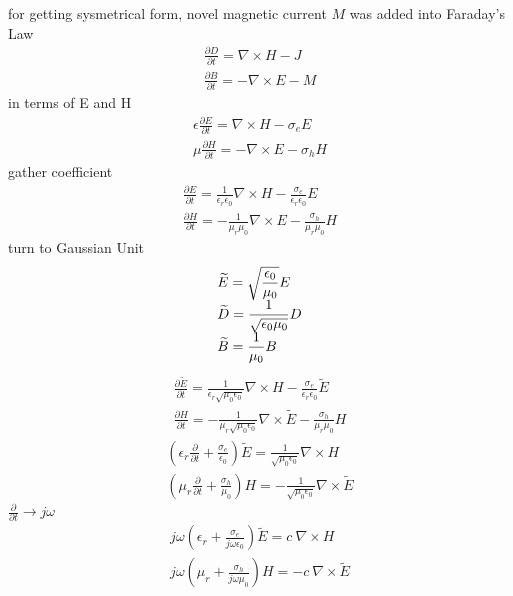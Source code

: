 for getting sysmetrical form, novel magnetic current $M$ was added into Faraday's Law
\begin{gather}
  \frac{\partial D}{\partial t} = \nabla \times H - J\\
  \frac{\partial B}{\partial t} =  - \nabla \times E - M
\end{gather}
in terms of E and H
\begin{gather}
  \epsilon\frac{\partial E}{\partial t} = \nabla \times H - \sigma_eE\\
  \mu\frac{\partial H}{\partial t} = - \nabla \times E - \sigma_hH
\end{gather}
gather coefficient 
\begin{gather}
  \frac{\partial E}{\partial t} = \frac{1}{\epsilon_r\epsilon_0}\nabla\times H - \frac{\sigma_e}{\epsilon_r\epsilon_0}E\\
  \frac{\partial H}{\partial t} = - \frac{1}{\mu_r\mu_0}\nabla\times E - \frac{\sigma_h}{\mu_r\mu_0}H
\end{gather}
turn to Gaussian Unit 
\begin{equation}
  \label{eq:gaussian_unit}
  \begin{array}{@{}l@{}}
    {\displaystyle\widetilde{E} = \sqrt{\frac{\epsilon_0}{\mu_0}}E}\\
    {\displaystyle\widetilde{D} = \frac{1}{\sqrt{\epsilon_0\mu_0}}D}\\
    {\displaystyle\widetilde{B} = \frac{1}{\mu_0}B}
  \end{array}
\end{equation}
\begin{gather}
  \frac{\partial \widetilde{E}}{\partial t} = \frac{1}{\epsilon_r\sqrt{\mu_0\epsilon_0}}\nabla\times H - \frac{\sigma_e}{\epsilon_r\epsilon_0}\widetilde{E}\\
  \frac{\partial H}{\partial t} = - \frac{1}{\mu_r\sqrt{\mu_0\epsilon_0}}\nabla\times\widetilde{E} - \frac{\sigma_h}{\mu_r\mu_0}H
\end{gather}
\begin{gather}
  \left(\epsilon_r\frac{\partial}{\partial t} + \frac{\sigma_e}{\epsilon_0}\right)\widetilde{E} = \frac{1}{\sqrt{\mu_0\epsilon_0}}\nabla\times H\\
  \left(\mu_r\frac{\partial}{\partial t} + \frac{\sigma_h}{\mu_0}\right)H = - \frac{1}{\sqrt{\mu_0\epsilon_0}}\nabla\times\widetilde{E}
\end{gather}
$\frac{\partial}{\partial t} \rightarrow j\omega$
\begin{gather}
  j\omega\left(\epsilon_r + \frac{\sigma_e}{j\omega\epsilon_0}\right)\widetilde{E} = c\ \nabla\times H\\
  j\omega\left(\mu_r + \frac{\sigma_h}{j\omega\mu_0}\right)H = - c\ \nabla\times\widetilde{E}
\end{gather}
